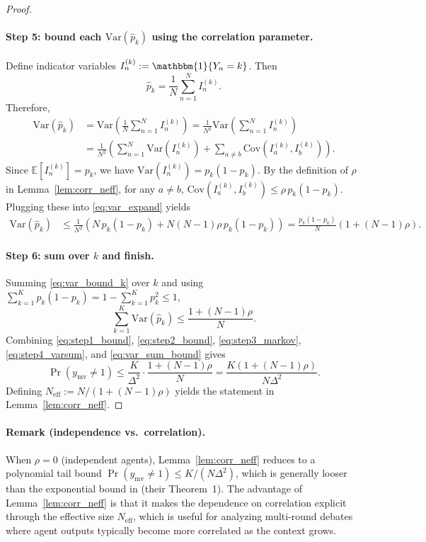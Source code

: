 \begin{proof}
\paragraph{Step 5: bound each $\mathrm{Var}(\hat p_k)$ using the correlation parameter.}
Define indicator variables \(I^{(k)}_n:=\mathbbm{1}\{Y_n=k\}\).
Then
\[
\hat p_k = \frac{1}{N}\sum_{n=1}^N I^{(k)}_n.
\]
Therefore,
\begin{align}
\mathrm{Var}(\hat p_k)
&= \mathrm{Var}\!\left(\frac{1}{N}\sum_{n=1}^N I^{(k)}_n\right)
= \frac{1}{N^2}\mathrm{Var}\!\left(\sum_{n=1}^N I^{(k)}_n\right)\nonumber\\
&= \frac{1}{N^2}\left(\sum_{n=1}^N \mathrm{Var}(I^{(k)}_n) + \sum_{a\neq b}\mathrm{Cov}(I^{(k)}_a,I^{(k)}_b)\right).
\label{eq:var_expand}
\end{align}
Since \(\mathbb{E}[I^{(k)}_n]=p_k\), we have \(\mathrm{Var}(I^{(k)}_n)=p_k(1-p_k)\).
By the definition of \(\rho\) in Lemma~\ref{lem:corr_neff}, for any \(a\neq b\),
\(\mathrm{Cov}(I^{(k)}_a,I^{(k)}_b)\le \rho\, p_k(1-p_k)\).
Plugging these into \eqref{eq:var_expand} yields
\begin{align}
\mathrm{Var}(\hat p_k)
&\le \frac{1}{N^2}\left(N\,p_k(1-p_k) + N(N-1)\rho\,p_k(1-p_k)\right)
= \frac{p_k(1-p_k)}{N}\left(1+(N-1)\rho\right).
\label{eq:var_bound_k}
\end{align}

\paragraph{Step 6: sum over $k$ and finish.}
Summing \eqref{eq:var_bound_k} over \(k\) and using \(\sum_{k=1}^K p_k(1-p_k)=1-\sum_{k=1}^K p_k^2\le 1\),
\begin{equation}
\sum_{k=1}^K \mathrm{Var}(\hat p_k)
\le \frac{1+(N-1)\rho}{N}.
\label{eq:var_sum_bound}
\end{equation}
Combining \eqref{eq:step1_bound}, \eqref{eq:step2_bound}, \eqref{eq:step3_markov}, \eqref{eq:step4_varsum}, and \eqref{eq:var_sum_bound} gives
\[
\Pr(y_{\mathrm{mv}}\neq 1)
\le \frac{K}{\Delta^2}\cdot \frac{1+(N-1)\rho}{N}
= \frac{K(1+(N-1)\rho)}{N\Delta^2}.
\]
Defining \(N_{\mathrm{eff}}:=N/(1+(N-1)\rho)\) yields the statement in Lemma~\ref{lem:corr_neff}.
\end{proof}

\paragraph{Remark (independence vs.\ correlation).}
When \(\rho=0\) (independent agents), Lemma~\ref{lem:corr_neff} reduces to a polynomial tail bound
\(\Pr(y_{\mathrm{mv}}\neq 1)\le K/(N\Delta^2)\), which is generally looser than the
exponential bound in \citet{choi2025debate} (their Theorem~1).
The advantage of Lemma~\ref{lem:corr_neff} is that it makes the dependence on correlation explicit
through the effective size \(N_{\mathrm{eff}}\), which is useful for analyzing multi-round debates where
agent outputs typically become more correlated as the context grows.

